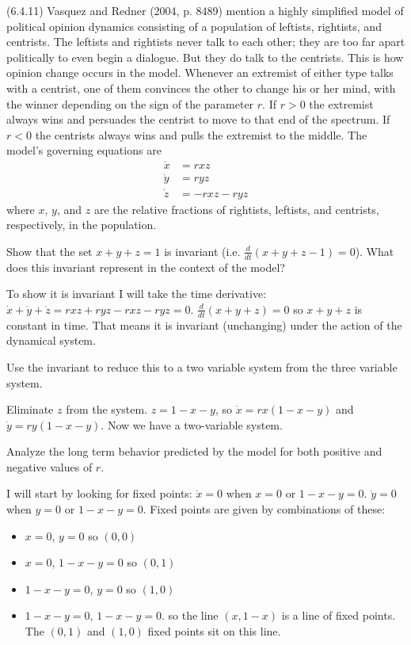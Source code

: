 \documentclass[12pt,letterpaper]{exam}
\begin{document}
\begin{questions}
\question (6.4.11) Vasquez and Redner (2004, p. 8489) mention a highly simplified model of political opinion dynamics consisting of a population of leftists, rightists, and centrists.  The leftists and rightists never talk to each other; they are too far apart politically to even begin a dialogue.  But they do talk to the centrists.  This is how opinion change occurs in the model.  Whenever an extremist of either type talks with a centrist, one of them convinces the other to change his or her mind, with the winner depending on the sign of the parameter $r$.  If $r>0$ the extremist always wins and persuades the centrist to move to that end of the spectrum.  If $r<0$ the centrists always wins and pulls the extremist to the middle.  The model's governing equations are
\begin{align*}
\dot{x}&= r x z \\
\dot{y}&=r y z\\
\dot{z}&=-rxz-ryz
\end{align*}
where $x$, $y$, and $z$ are the relative fractions of rightists, leftists, and centrists, respectively, in the population.
\begin{parts}
\item Show that the set $x+y+z = 1$ is invariant (i.e. $\frac{d}{dt}(x + y + z - 1) = 0$).  What does this invariant represent in the context of the model?
\begin{solution}
To show it is invariant I will take the time derivative: $\dot{x} + \dot{y} + \dot{z} = r x z + r y z - r x z - r y z = 0$.  $\frac{d}{dt}(x+y+z) = 0$ so $x+y+z$ is constant in time.  That means it is invariant (unchanging) under the action of the dynamical system.
\end{solution}
\item Use the invariant to reduce this to a two variable system from the three variable system. 
\begin{solution}
Eliminate $z$ from the system. $z = 1- x- y$, so $\dot{x} = rx (1-x-y)$ and $\dot{y} = r y (1-x-y)$.  Now we have a two-variable system.
\end{solution}
\item Analyze the long term behavior predicted by the model for both positive and negative values of $r$.
\begin{solution}
I will start by looking for fixed points:
$\dot{x} = 0$ when $x=0$ or $1-x-y = 0$.  $\dot{y} = 0$ when $ y = 0$ or $1 -x - y = 0$.  Fixed points are given by combinations of these:
\begin{itemize}
\item $x = 0$, $y = 0$ so $(0,0)$
\item $x = 0$, $1-x-y = 0$ so $(0,1)$
\item $1-x-y = 0$, $y = 0$ so $(1,0)$
\item $1 -x -y = 0$, $1-x-y = 0$. so the line $(x, 1-x)$ is a line of fixed points.  The $(0,1)$ and $(1,0)$ fixed points sit on this line.
\end{itemize}


\end{solution}
\end{parts}
\end{questions}
\end{document}
